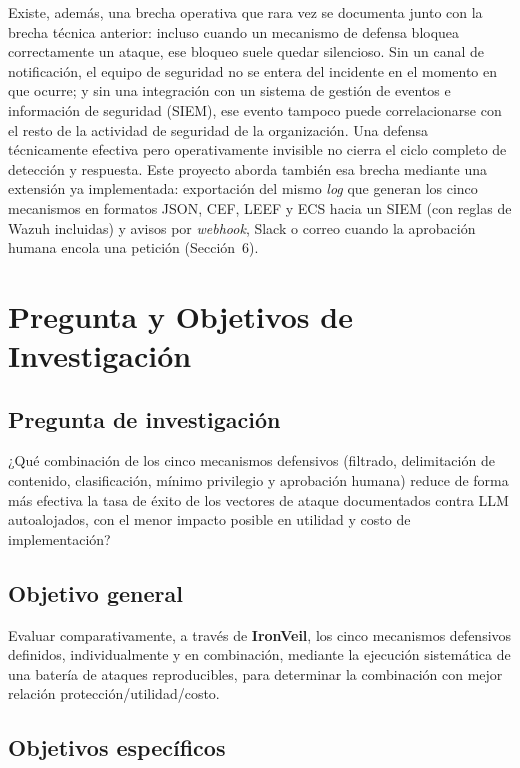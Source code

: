 \documentclass[11pt,letterpaper]{article}
\begin{document}
Existe, además, una brecha operativa que rara vez se documenta junto con la brecha técnica anterior: incluso cuando un mecanismo de defensa bloquea correctamente un ataque, ese bloqueo suele quedar silencioso. Sin un canal de notificación, el equipo de seguridad no se entera del incidente en el momento en que ocurre; y sin una integración con un sistema de gestión de eventos e información de seguridad (SIEM), ese evento tampoco puede correlacionarse con el resto de la actividad de seguridad de la organización. Una defensa técnicamente efectiva pero operativamente invisible no cierra el ciclo completo de detección y respuesta. Este proyecto aborda también esa brecha mediante una extensión ya implementada: exportación del mismo \emph{log} que generan los cinco mecanismos en formatos JSON, CEF, LEEF y ECS hacia un SIEM (con reglas de Wazuh incluidas) y avisos por \emph{webhook}, Slack o correo cuando la aprobación humana encola una petición (Sección~6).

\section{Pregunta y Objetivos de Investigación}

\subsection{Pregunta de investigación}

{¿Qué combinación de los cinco mecanismos defensivos (filtrado, delimitación de contenido, clasificación, mínimo privilegio y aprobación humana) reduce de forma más efectiva la tasa de éxito de los vectores de ataque documentados contra LLM autoalojados, con el menor impacto posible en utilidad y costo de implementación?}

\subsection{Objetivo general}

Evaluar comparativamente, a través de \textbf{IronVeil}, los cinco mecanismos defensivos definidos, individualmente y en combinación, mediante la ejecución sistemática de una batería de ataques reproducibles, para determinar la combinación con mejor relación protección/utilidad/costo.

\subsection{Objetivos específicos}
\end{document}
